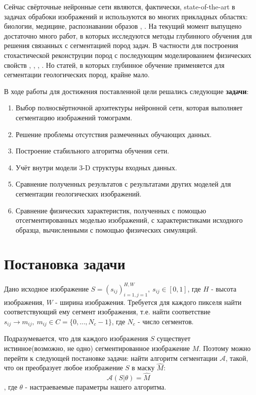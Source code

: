 \documentclass[14pt, a4paper, oneside, bold]{extarticle}
\begin{document}
Сейчас свёрточные нейронные сети являются, фактически, state-of-the-art в задачах обрабоки изображений \cite{6} и используются во многих прикладных областях: биологии, медицине, распознавании образов \cite{11}, \cite{12}. На текущий момент выпущено достаточно много работ, в которых исследуются методы глубинного обучения для решения связанных с сегментацией пород задач. В частности для  построения стохастической реконструции пород с последующим моделированием физических свойств \cite{7}, \cite{8}, \cite{9}, \cite{10}. Но статей, в которых глубинное обучение применяется для сегментации геологических пород, крайне мало. 

В ходе работы для достижения поставленной цели решались следующие 
\textbf{задачи}:
\begin{enumerate}
	\item Выбор полносвёртночной архитектуры нейронной сети, 
	которая выполняет сегментацию изображений томограмм.
	\item Решение проблемы отсутствия размеченных обучающих данных.
	\item Построение стабильного алгоритма обучения сети.
	\item Учёт внутри модели 3-D структуры входных данных.
	\item Сравнение полученных результатов с результатами других 			моделей для сегментации геологических изображений.
	\item Сравнение физических характеристик, полученных с помощью 
	отсегментированных моделью изображений, с характеристиками 				исходного образца, вычисленными с помощью физических симуляций.
\end{enumerate}
  
\newpage


\section{Постановка задачи}

Дано исходное изображение 
	$S = (s_{ij})_{i=1, j=1}^{H, W},\ s_{ij} \in [0, 1]$, где 
$H$ - высота изображения, $W$ - ширина изображения. 
Требуется для каждого пикселя найти соответствующий ему сегмент изображения, 
т.е. найти соответствие $s_{ij} \rightarrow m_{ij},\ m_{ij} \in C = \{ 0, ... , N_c-1 \} $,
где $N_c$ - число сегментов.

Подразумевается, что для каждого изображения $S$ существует 
истинное(возможно, не одно) сегментированное изображение $M$.
Поэтому можно перейти к следующей постановке задачи: найти алгоритм сегментации $\mathcal{A}$, такой, что он преобразует любое 
изображение $S$ в  маску $\hat{M}$:
\begin{equation}
	\mathcal{A}(S | \theta) = \hat{M}
\end{equation} 
, где $\theta$ - настраеваемые параметры нашего алгоритма.
\end{document}
